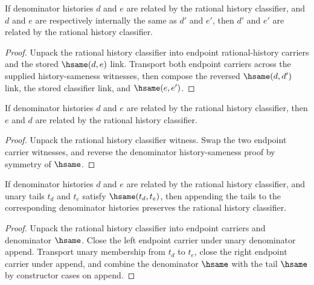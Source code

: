 \begin{theorem}
\label{thm:rat-history-classifier-hsame-transport}
If denominator histories $d$ and $e$ are related by the rational history
classifier, and $d$ and $e$ are respectively internally the same as
$d'$ and $e'$, then $d'$ and $e'$ are related by the rational history
classifier.
\end{theorem}
\begin{proof}
Unpack the rational history classifier into endpoint rational-history carriers
and the stored $\hsame(d,e)$ link. Transport both endpoint carriers across
the supplied history-sameness witnesses, then compose the reversed
$\hsame(d,d')$ link, the stored classifier link, and $\hsame(e,e')$.
\end{proof}

\begin{theorem}
\label{thm:rat-history-classifier-symmetry}
If denominator histories $d$ and $e$ are related by the rational history
classifier, then $e$ and $d$ are related by the rational history classifier.
\end{theorem}
\begin{proof}
Unpack the rational history classifier witness. Swap the two endpoint carrier
witnesses, and reverse the denominator history-sameness proof by symmetry of
$\hsame$.
\end{proof}

\begin{theorem}
\label{thm:rat-history-classifier-append-unary-denominator-closed}
If denominator histories $d$ and $e$ are related by the rational history
classifier, and unary tails $t_d$ and $t_e$ satisfy $\hsame(t_d,t_e)$,
then appending the tails to the corresponding denominator histories preserves
the rational history classifier.
\end{theorem}
\begin{proof}
Unpack the rational history classifier into endpoint carriers and denominator
$\hsame$. Close the left endpoint carrier under unary denominator append.
Transport unary membership from $t_d$ to $t_e$, close the right endpoint
carrier under append, and combine the denominator $\hsame$ with the tail
$\hsame$ by constructor cases on append.
\end{proof}

